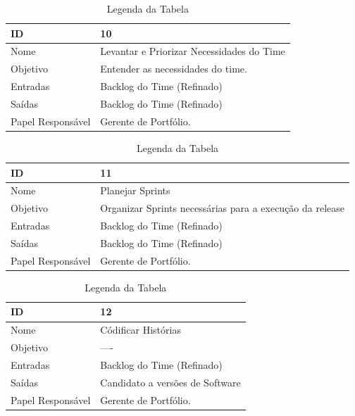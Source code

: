   \begin{table}[H]
    \centering
      \begin{tabular}{| m{5em} | m{10cm} |}
        \hline
        ID       & 10   \\ \hline
        Nome     & Levantar e Priorizar Necessidades do Time  \\ \hline
        Objetivo & Entender as necessidades do time.  \\ \hline
        Entradas & Backlog do Time (Refinado)\\ \hline
        Saídas   & Backlog do Time (Refinado) \\ \hline
        Papel Responsável   & Gerente de Portfólio. \\ \hline
      \end{tabular}
      \caption{Legenda da Tabela}
      \label{tabela:atividade10}
  \end{table}

  \begin{table}[H]
    \centering
      \begin{tabular}{| m{5em} | m{10cm} |}
        \hline
        ID       & 11   \\ \hline
        Nome     & Planejar Sprints  \\ \hline
        Objetivo & Organizar Sprints necessárias para a execução da release  \\ \hline
        Entradas & Backlog do Time (Refinado)\\ \hline
        Saídas   & Backlog do Time (Refinado) \\ \hline
        Papel Responsável   & Gerente de Portfólio. \\ \hline
      \end{tabular}
      \caption{Legenda da Tabela}
      \label{tabela:atividade11}
  \end{table}

  \begin{table}[H]
    \centering
      \begin{tabular}{| m{5em} | m{10cm} |}
        \hline
        ID       & 12   \\ \hline
        Nome     & Códificar Histórias  \\ \hline
        Objetivo & ----  \\ \hline
        Entradas & Backlog do Time (Refinado)\\ \hline
        Saídas   & Candidato a versões de Software \\ \hline
        Papel Responsável   & Gerente de Portfólio. \\ \hline
      \end{tabular}
      \caption{Legenda da Tabela}
      \label{tabela:atividade12}
  \end{table}

